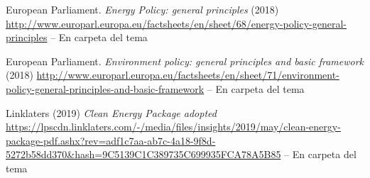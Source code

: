 \documentclass{nuevotema}
\begin{document}
European Parliament. \textit{Energy Policy: general principles} (2018) \url{http://www.europarl.europa.eu/factsheets/en/sheet/68/energy-policy-general-principles} -- En carpeta del tema

European Parliament. \textit{Environment policy: general principles and basic framework} (2018) \url{http://www.europarl.europa.eu/factsheets/en/sheet/71/environment-policy-general-principles-and-basic-framework} -- En carpeta del tema

Linklaters (2019) \textit{Clean Energy Package adopted} \url{https://lpscdn.linklaters.com/-/media/files/insights/2019/may/clean-energy-package-pdf.ashx?rev=adf1c7aa-ab7c-4a18-9f8d-5272b58dd370&hash=9C5139C1C389735C699935FCA78A5B85} -- En carpeta del tema
\end{document}
